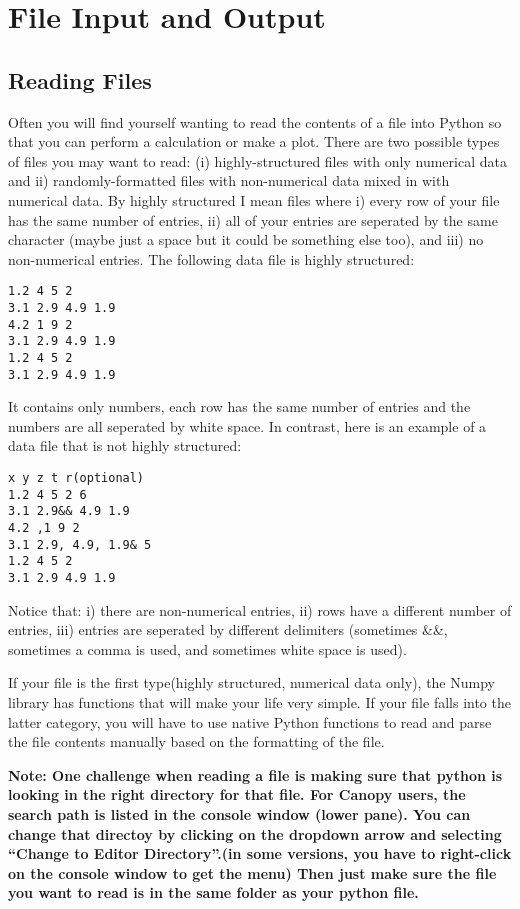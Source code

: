 \chapter{File Input and Output}

\label{chap:fileio}

\section{Reading Files}
Often you will find yourself wanting to read the contents of a file
into Python so that you can perform a calculation or make a plot.
There are two possible types of files you may want to read: (i)
highly-structured files with only numerical data and ii)
randomly-formatted files with non-numerical data mixed in with
numerical data.  By highly structured I mean files where i) every row of your
file has the same number of entries, ii) all of your entries are
seperated by the same character (maybe just a space but it could be
something else too), and iii) no non-numerical entries.  The following
data file is highly structured:
\begin{Verbatim}
1.2 4 5 2
3.1 2.9 4.9 1.9
4.2 1 9 2
3.1 2.9 4.9 1.9
1.2 4 5 2
3.1 2.9 4.9 1.9
\end{Verbatim}
It contains only numbers, each row has the same number of entries and
the numbers are all seperated by white space.  In contrast, here is an
example of a data file that is not highly structured:
\begin{Verbatim}
x y z t r(optional)
1.2 4 5 2 6
3.1 2.9&& 4.9 1.9
4.2 ,1 9 2
3.1 2.9, 4.9, 1.9& 5
1.2 4 5 2
3.1 2.9 4.9 1.9
\end{Verbatim}
Notice that: i) there are non-numerical entries, ii) rows have a
different number of entries, iii) entries are seperated by different
delimiters (sometimes \&\&, sometimes a comma is used, and sometimes
white space is used).

If your file is the first type(highly structured, numerical data
only), the Numpy library has functions that will make your life very
simple.  If your file falls into the latter category, you will have to
use native Python functions to read and parse the file contents manually based
on the formatting of the file.


\indent \textbf{Note: One challenge when reading a file is making sure
  that python is looking in the right directory for that file. For
  Canopy users, the search path is listed in the console window (lower
  pane). You can change that directoy by clicking on the dropdown
  arrow and selecting ``Change to Editor Directory''.(in some
  versions, you have to right-click on the console window to get the
  menu) Then just make sure the file you want to read is in the same
  folder as your python file. }

